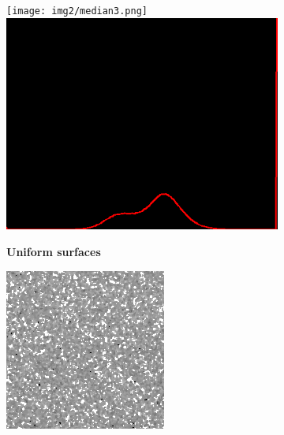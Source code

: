 \begin{figure}[H]
    \centering
    \begin{subfigure}[b]{0.24\textwidth}
        \texttt{[image: img2/median3.png]}\\[0.1cm]
        \includegraphics[width=\textwidth]{img2/hist_3_median_3_final_img2.png}
        \begin{center}
        	\textbf{Uniform surfaces}
        \end{center}
        \includegraphics[width=\textwidth]{img2/rect_3_median_3_final_img2.png}\\[0.1cm]

\end{subfigure}
\end{figure}

